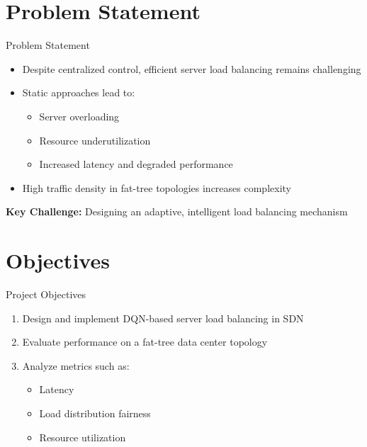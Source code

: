 \documentclass[aspectratio=169]{beamer}
\begin{document}
\section{Problem Statement}
\begin{frame}{Problem Statement}
\begin{itemize}
    \item Despite centralized control, efficient server load balancing remains challenging
    \item Static approaches lead to:
    \begin{itemize}
        \item Server overloading
        \item Resource underutilization
        \item Increased latency and degraded performance
    \end{itemize}
    \item High traffic density in fat-tree topologies increases complexity
\end{itemize}

\vspace{0.5em}
\textbf{Key Challenge:} Designing an \alert{adaptive, intelligent load balancing mechanism}
\end{frame}

\section{Objectives}
\begin{frame}{Project Objectives}
\begin{enumerate}
    \item Design and implement DQN-based server load balancing in SDN
    \item Evaluate performance on a fat-tree data center topology
    \item Analyze metrics such as:
    \begin{itemize}
        \item Latency
        \item Load distribution fairness
        \item Resource utilization
    \end{itemize}
\end{enumerate}
\end{frame}

\end{document}
